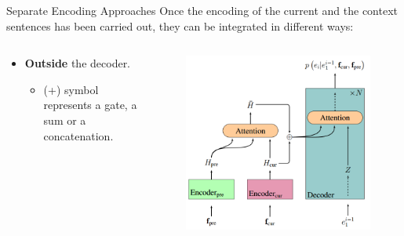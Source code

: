 \begin{frame}{Separate Encoding Approaches}
Once the encoding of the current and the context sentences has been carried out, they can be integrated in different ways:
	\begin{columns}[T] %
		\begin{column}{.50\textwidth}
			\begin{itemize}
				\item \textbf{Outside} the decoder. 
				\begin{itemize}
					\item (+) symbol represents a gate, a sum or a concatenation.
				\end{itemize}
			\end{itemize}
		\end{column}%
		\hfill%
		\begin{column}{.50\textwidth}
			\begin{figure}
				\centering
				\includegraphics[width=0.90\linewidth]{Images/models_outide_decoder}
				\label{fig:modelsoutidedecoder}
			\end{figure}
		\end{column}%
	\end{columns} 
\end{frame}

